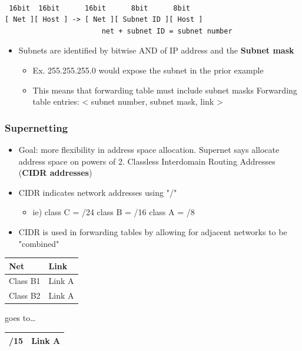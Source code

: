 \documentclass[11pt]{article}
\begin{document}
\begin{verbatim}

 16bit  16bit      16bit      8bit      8bit
[ Net ][ Host ] -> [ Net ][ Subnet ID ][ Host ]
                       net + subnet ID = subnet number
\end{verbatim}

\begin{itemize}
\item Subnets are identified by bitwise AND of IP address and the \textbf{Subnet
mask}
\begin{itemize}
\item Ex. 255.255.255.0 would expose the subnet in the prior example
\item This means that forwarding table must include subnet masks
Forwarding table entries: < subnet number, subnet mask, link >
\end{itemize}
\end{itemize}

\subsubsection{Supernetting}
\label{sec:orgheadline57}
\begin{itemize}
\item Goal: more flexibility in address space allocation. Supernet says
allocate address space on powers of 2. Classless Interdomain
Routing Addresses (\textbf{CIDR addresses})
\item CIDR indicates network addresses using "/" 
\begin{itemize}
\item ie) 
class C = /24
class B = /16
class A = /8
\end{itemize}
\item CIDR is used in forwarding tables by allowing for adjacent networks
to be "combined"
\end{itemize}
\begin{center}
\begin{tabular}{ll}
\hline
Net & Link\\
\hline
Class B1 & Link A\\
Class B2 & Link A\\
\hline
\end{tabular}
\end{center}

goes to\ldots{}

\begin{center}
\begin{tabular}{ll}
\hline
/15 & Link A\\
\hline
\end{tabular}
\end{center}
\end{document}
